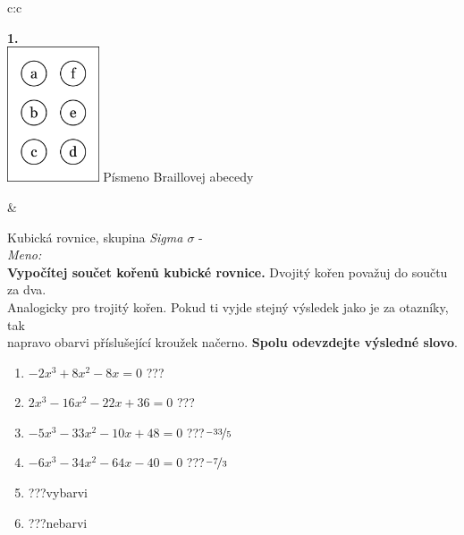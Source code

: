 \documentclass[10pt]{report}
\begin{document}
\begin{tabular}{c:c}
\begin{minipage}[c][99mm][t]{0.49\linewidth}
\begin{center}
\begin{minipage}{0.20\linewidth}
\begin{center}
{\Huge\bfseries 1.} \\[2mm]
\includegraphics[height=40mm]{../images/braille.png}
{\small Písmeno Braillovej abecedy}
\end{center}
\end{minipage}
\end{center}
\end{minipage}
&
\begin{minipage}[c][99mm][t]{0.49\linewidth}
\begin{center}
\vspace{7mm}
{\huge Kubická rovnice, skupina \textit{Sigma $\sigma$} -}\\[4.5mm]
\textit{Meno:}\phantom{xxxxxxxxxxxxxxxxxxxxxxxxxxxxxxxxxxxxxxxxxxxxxxxxxxxxxxxxxxxxxxxxx}\\[3.5mm]
\textbf{Vypočítej součet kořenů kubické rovnice.} Dvojitý kořen považuj do součtu za dva.\\Analogicky pro trojitý kořen. Pokud ti vyjde stejný výsledek jako je za otazníky, tak\\napravo obarvi příslušející kroužek načerno. \textbf{Spolu odevzdejte výsledné slovo}.\\[3mm]
\begin{minipage}{0.77\linewidth}
\begin{center}
\begin{varwidth}{\textwidth}
\begin{enumerate}
\large
\item $-2x^3+8x^2-8x=0$\quad \dotfill\; ???\;\dotfill {}
\item $2x^3-16x^2-22x+36=0$\quad \dotfill\; ???\;\dotfill {}
\item $-5x^3-33x^2-10x+48=0$\quad \dotfill\; ???\;\dotfill \quad $\nicefrac{-33}{5}$
\item $-6x^3-34x^2-64x-40=0$\quad \dotfill\; ???\;\dotfill \quad $\nicefrac{-7}{3}$
\item \quad \dotfill\; ???\;\dotfill \quad vybarvi
\item \quad \dotfill\; ???\;\dotfill \quad nebarvi
\end{enumerate}

\end{varwidth}
\end{center}
\end{minipage}
\end{center}
\end{minipage}
\end{tabular}
\end{document}
